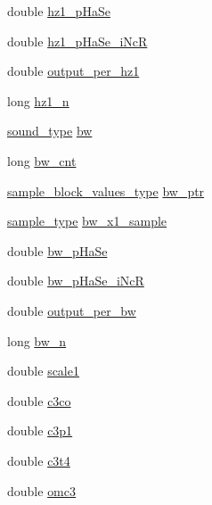 \begin{DoxyCompactItemize}
\item 
double \hyperlink{structresonvv__susp__struct_a912b08d0288b3134418b8c5a6604e716}{hz1\+\_\+p\+Ha\+Se}
\item 
double \hyperlink{structresonvv__susp__struct_a45940de540e92a4b5af0cd1dd134387b}{hz1\+\_\+p\+Ha\+Se\+\_\+i\+NcR}
\item 
double \hyperlink{structresonvv__susp__struct_ad507bac15f707cba825f4023df539d52}{output\+\_\+per\+\_\+hz1}
\item 
long \hyperlink{structresonvv__susp__struct_a50f2c1552b479477d66c01497b94bef9}{hz1\+\_\+n}
\item 
\hyperlink{sound_8h_a792cec4ed9d6d636d342d9365ba265ea}{sound\+\_\+type} \hyperlink{structresonvv__susp__struct_a62e43d691251666dd80f7f0c257ba8c1}{bw}
\item 
long \hyperlink{structresonvv__susp__struct_ad9f09d7b337264caa9a374cd527b8a3b}{bw\+\_\+cnt}
\item 
\hyperlink{sound_8h_a83d17f7b465d1591f27cd28fc5eb8a03}{sample\+\_\+block\+\_\+values\+\_\+type} \hyperlink{structresonvv__susp__struct_a21d93a6a6b3783a5911e914a3334cfef}{bw\+\_\+ptr}
\item 
\hyperlink{sound_8h_a3a9d1d4a1c153390d2401a6e9f71b32c}{sample\+\_\+type} \hyperlink{structresonvv__susp__struct_a1665c02071bb2cdcc43580ee57632618}{bw\+\_\+x1\+\_\+sample}
\item 
double \hyperlink{structresonvv__susp__struct_a0063131c1fcd607ea209629bf2af02fd}{bw\+\_\+p\+Ha\+Se}
\item 
double \hyperlink{structresonvv__susp__struct_a6fc75f5e5355cd3df2999d3e7e12fc36}{bw\+\_\+p\+Ha\+Se\+\_\+i\+NcR}
\item 
double \hyperlink{structresonvv__susp__struct_a0c576e14fd505d51dfb2e1b7f3072f9a}{output\+\_\+per\+\_\+bw}
\item 
long \hyperlink{structresonvv__susp__struct_a9b9bba761ce472ae0032241dc456085a}{bw\+\_\+n}
\item 
double \hyperlink{structresonvv__susp__struct_a45842d0fa92c59ded8e73f97132bd5c6}{scale1}
\item 
double \hyperlink{structresonvv__susp__struct_a5a33dfe761c2c233109c7fa2bcb58e31}{c3co}
\item 
double \hyperlink{structresonvv__susp__struct_a18b5cdcc63403879abe4045db2262049}{c3p1}
\item 
double \hyperlink{structresonvv__susp__struct_a1968a492794914b0347c530d2d20f3e4}{c3t4}
\item 
double \hyperlink{structresonvv__susp__struct_ae3a929efd985dfc0294128933061a01b}{omc3}

\end{DoxyCompactItemize}

